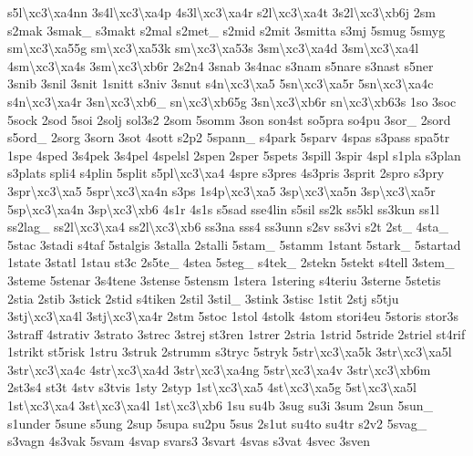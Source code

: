 {s5l\textbackslash{}xc3\textbackslash{}xa4nn 3s4l\textbackslash{}xc3\textbackslash{}xa4p 4s3l\textbackslash{}xc3\textbackslash{}xa4r s2l\textbackslash{}xc3\textbackslash{}xa4t 3s2l\textbackslash{}xc3\textbackslash{}xb6j 2sm s2mak 3smak\-\_\- s3makt s2mal s2met\-\_\- s2mid s2mit 3smitta s3mj 5smug 5smyg sm\textbackslash{}xc3\textbackslash{}xa55g sm\textbackslash{}xc3\textbackslash{}xa53k sm\textbackslash{}xc3\textbackslash{}xa53s 3sm\textbackslash{}xc3\textbackslash{}xa4d 3sm\textbackslash{}xc3\textbackslash{}xa4l 4sm\textbackslash{}xc3\textbackslash{}xa4s 3sm\textbackslash{}xc3\textbackslash{}xb6r 2s2n4 3snab 3s4nac s3nam s5nare s3nast s5ner 3snib 3snil 3snit 1snitt s3niv 3snut s4n\textbackslash{}xc3\textbackslash{}xa5 5sn\textbackslash{}xc3\textbackslash{}xa5r 5sn\textbackslash{}xc3\textbackslash{}xa4c s4n\textbackslash{}xc3\textbackslash{}xa4r 3sn\textbackslash{}xc3\textbackslash{}xb6\-\_\- sn\textbackslash{}xc3\textbackslash{}xb65g 3sn\textbackslash{}xc3\textbackslash{}xb6r sn\textbackslash{}xc3\textbackslash{}xb63s 1so 3soc 5sock 2sod 5soi 2solj sol3s2 2som 5somm 3son son4st so5pra so4pu 3sor\-\_\- 2sord s5ord\-\_\- 2sorg 3sorn 3sot 4sott s2p2 5spann\-\_\- s4park 5sparv 4spas s3pass spa5tr 1spe 4sped 3s4pek 3s4pel 4spelsl 2spen 2sper 5spets 3spill 3spir 4spl s1pla s3plan s3plats spli4 s4plin 5split s5pl\textbackslash{}xc3\textbackslash{}xa4 4spre s3pres 4s3pris 3sprit 2spro s3pry 3spr\textbackslash{}xc3\textbackslash{}xa5 5spr\textbackslash{}xc3\textbackslash{}xa4n s3ps 1s4p\textbackslash{}xc3\textbackslash{}xa5 3sp\textbackslash{}xc3\textbackslash{}xa5n 3sp\textbackslash{}xc3\textbackslash{}xa5r 5sp\textbackslash{}xc3\textbackslash{}xa4n 3sp\textbackslash{}xc3\textbackslash{}xb6 4s1r 4s1s s5sad sse4lin s5sil ss2k ss5kl ss3kun ss1l ss2lag\-\_\- ss2l\textbackslash{}xc3\textbackslash{}xa4 ss2l\textbackslash{}xc3\textbackslash{}xb6 ss3na sss4 ss3unn s2sv ss3vi s2t 2st\-\_\- 4sta\-\_\- 5stac 3stadi s4taf 5stalgis 3stalla 2stalli 5stam\-\_\- 5stamm 1stant 5stark\-\_\- 5startad 1state 3statl 1stau st3c 2s5te\-\_\- 4stea 5steg\-\_\- s4tek\-\_\- 2stekn 5stekt s4tell 3stem\-\_\- 3steme 5stenar 3s4tene 3stense 5stensm 1stera 1stering s4teriu 3sterne 5stetis 2stia 2stib 3stick 2stid s4tiken 2stil 3stil\-\_\- 3stink 3stisc 1stit 2stj s5tju 3stj\textbackslash{}xc3\textbackslash{}xa4l 3stj\textbackslash{}xc3\textbackslash{}xa4r 2stm 5stoc 1stol 4stolk 4stom stori4eu 5storis stor3s 3straff 4strativ 3strato 3strec 3strej st3ren 1strer 2stria 1strid 5stride 2striel st4rif 1strikt st5risk 1stru 3struk 2strumm s3tryc 5stryk 5str\textbackslash{}xc3\textbackslash{}xa5k 3str\textbackslash{}xc3\textbackslash{}xa5l 3str\textbackslash{}xc3\textbackslash{}xa4c 4str\textbackslash{}xc3\textbackslash{}xa4d 3str\textbackslash{}xc3\textbackslash{}xa4ng 5str\textbackslash{}xc3\textbackslash{}xa4v 3str\textbackslash{}xc3\textbackslash{}xb6m 2st3s4 st3t 4stv s3tvis 1sty 2styp 1st\textbackslash{}xc3\textbackslash{}xa5 4st\textbackslash{}xc3\textbackslash{}xa5g 5st\textbackslash{}xc3\textbackslash{}xa5l 1st\textbackslash{}xc3\textbackslash{}xa4 3st\textbackslash{}xc3\textbackslash{}xa4l 1st\textbackslash{}xc3\textbackslash{}xb6 1su su4b 3sug su3i 3sum 2sun 5sun\-\_\- s1under 5sune s5ung 2sup 5supa su2pu 5sus 2s1ut su4to su4tr s2v2 5svag\-\_\- s3vagn 4s3vak 5svam 4svap svars3 3svart 4svas s3vat 4svec 3sven }
